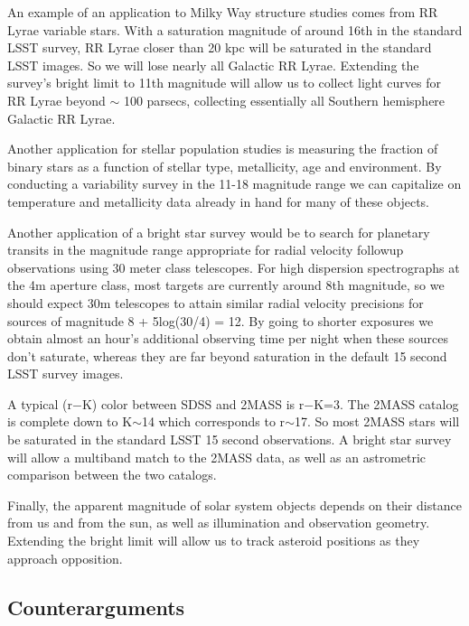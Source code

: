 An example of an application to Milky Way structure studies comes from
RR Lyrae variable stars. With a saturation magnitude of around 16th in
the standard LSST survey, RR Lyrae closer than 20 kpc will be saturated
in the standard LSST images. So we will lose nearly all Galactic RR
Lyrae. Extending the survey's bright limit to 11th magnitude will allow
us to collect light curves for RR Lyrae beyond $\sim$ 100 parsecs,
collecting essentially all Southern hemisphere Galactic RR Lyrae.

Another application for stellar population studies is measuring the
fraction of binary stars as a function of stellar type, metallicity, age
and environment. By conducting a variability survey in the 11-18
magnitude range we can capitalize on temperature and metallicity data
already in hand for many of these objects.

Another application of a bright star survey would be to search for
planetary transits in the magnitude range appropriate for radial
velocity followup observations using 30 meter class telescopes. For high
dispersion spectrographs at the 4m aperture class, most targets are
currently around 8th magnitude, so we should expect 30m telescopes to
attain similar radial velocity precisions for sources of magnitude  8 +
5log(30/4) = 12. By going to shorter exposures we obtain almost an
hour's additional observing time per night when these sources don't
saturate, whereas they are far beyond saturation in the default 15
second LSST survey images.

A typical (r$-$K) color between SDSS and 2MASS is r$-$K=3. The 2MASS
catalog is complete down to K$\sim$14 which corresponds to r$\sim$17. So
most 2MASS stars will be saturated in the standard LSST 15 second
observations. A bright star survey will allow a multiband match to the
2MASS data, as well as an astrometric comparison between the two
catalogs.

Finally, the apparent magnitude of solar system objects depends on their
distance from us and from the sun, as well as illumination and
observation geometry. Extending the bright limit will allow us to track
asteroid positions as they approach opposition.



\subsection{Counterarguments}
\label{sec:\secname:counter}


